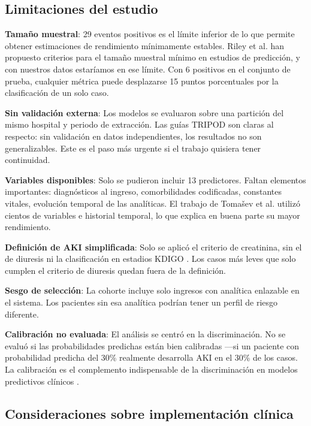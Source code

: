 \documentclass[12pt, a4paper, oneside]{report}
\begin{document}
\subsection{Limitaciones del estudio}

\textbf{Tamaño muestral}: 29 eventos positivos es el límite inferior de lo que permite obtener estimaciones de rendimiento mínimamente estables. Riley et al. \parencite{riley2020minimum} han propuesto criterios para el tamaño muestral mínimo en estudios de predicción, y con nuestros datos estaríamos en ese límite. Con 6 positivos en el conjunto de prueba, cualquier métrica puede desplazarse 15 puntos porcentuales por la clasificación de un solo caso.

\textbf{Sin validación externa}: Los modelos se evaluaron sobre una partición del mismo hospital y periodo de extracción. Las guías TRIPOD \parencite{collins2015tripod} son claras al respecto: sin validación en datos independientes, los resultados no son generalizables. Este es el paso más urgente si el trabajo quisiera tener continuidad.

\textbf{Variables disponibles}: Solo se pudieron incluir 13 predictores. Faltan elementos importantes: diagnósticos al ingreso, comorbilidades codificadas, constantes vitales, evolución temporal de las analíticas. El trabajo de Tomašev et al. \parencite{tomasev2019nature} utilizó cientos de variables e historial temporal, lo que explica en buena parte su mayor rendimiento.

\textbf{Definición de AKI simplificada}: Solo se aplicó el criterio de creatinina, sin el de diuresis ni la clasificación en estadios KDIGO \parencite{kdigo2012aki}. Los casos más leves que solo cumplen el criterio de diuresis quedan fuera de la definición.

\textbf{Sesgo de selección}: La cohorte incluye solo ingresos con analítica enlazable en el sistema. Los pacientes sin esa analítica podrían tener un perfil de riesgo diferente.

\textbf{Calibración no evaluada}: El análisis se centró en la discriminación. No se evaluó si las probabilidades predichas están bien calibradas —si un paciente con probabilidad predicha del 30\% realmente desarrolla AKI en el 30\% de los casos. La calibración es el complemento indispensable de la discriminación en modelos predictivos clínicos \parencite{steyerberg2014validation}.

\subsection{Consideraciones sobre implementación clínica}
\end{document}
